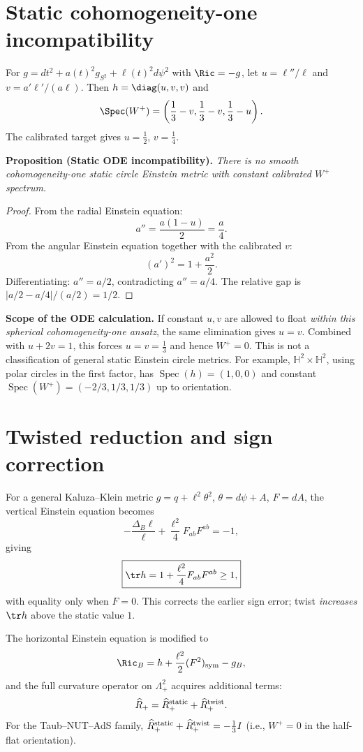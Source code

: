 \section{Static cohomogeneity-one incompatibility}

For $g=dt^2+a(t)^2g_{S^2}+\ell(t)^2d\psi^2$ with $\Ric=-g$, let
$u=\ell''/\ell$ and $v=a'\ell'/(a\ell)$.  Then $h=\diag(u,v,v)$ and
\[
 \Spec(W^+)=\left(\frac13-v,\frac13-v,\frac13-u\right).
\]
The calibrated target gives $u=\frac12$, $v=\frac14$.

\medskip
\noindent\textbf{Proposition (Static ODE incompatibility).}
\emph{There is no smooth cohomogeneity-one static circle Einstein metric
with constant calibrated $W^+$ spectrum.}

\begin{proof}
From the radial Einstein equation:
\[
 a''=\frac{a(1-u)}{2}=\frac{a}{4}.
\]
From the angular Einstein equation together with the calibrated $v$:
\[
 (a')^2=1+\frac{a^2}{2}.
\]
Differentiating: $a''=a/2$, contradicting $a''=a/4$.  The relative gap is
$|a/2-a/4|/(a/2)=1/2$.
\end{proof}

\noindent\textbf{Scope of the ODE calculation.}
If constant $u,v$ are allowed to float \emph{within this spherical
cohomogeneity-one ansatz}, the same elimination gives $u=v$.  Combined with
$u+2v=1$, this forces $u=v=\frac13$ and hence $W^+=0$.  This is not a
classification of general static Einstein circle metrics.  For example,
$\mathbb H^2\times\mathbb H^2$, using polar circles in the first factor, has
$\operatorname{Spec}(h)=(1,0,0)$ and constant
$\operatorname{Spec}(W^+)=(-2/3,1/3,1/3)$ up to orientation.

\section{Twisted reduction and sign correction}

For a general Kaluza--Klein metric $g=q+\ell^2\theta^2$, $\theta=d\psi+A$,
$F=dA$, the vertical Einstein equation becomes
\[
 -\frac{\Delta_B\ell}{\ell}+\frac{\ell^2}{4}F_{ab}F^{ab}=-1,
\]
giving
\begin{equation}\label{eq:tr-h-twisted}
 \boxed{\tr h=1+\frac{\ell^2}{4}F_{ab}F^{ab}\ge1,}
\end{equation}
with equality only when $F=0$.  This corrects the earlier sign error;
twist \emph{increases} $\tr h$ above the static value $1$.

The horizontal Einstein equation is modified to
\[
 \Ric_B=h+\frac{\ell^2}{2}(F^2)_{\rm sym}-g_B,
\]
and the full curvature operator on $\Lambda^2_+$ acquires additional terms:
\[
 \widehat R_+=\widehat R_+^{\rm static}+\widehat R_+^{\rm twist}.
\]
For the Taub--NUT--AdS family,
$\widehat R_+^{\rm static}+\widehat R_+^{\rm twist}=-\frac13I$
(i.e., $W^+=0$ in the half-flat orientation).

